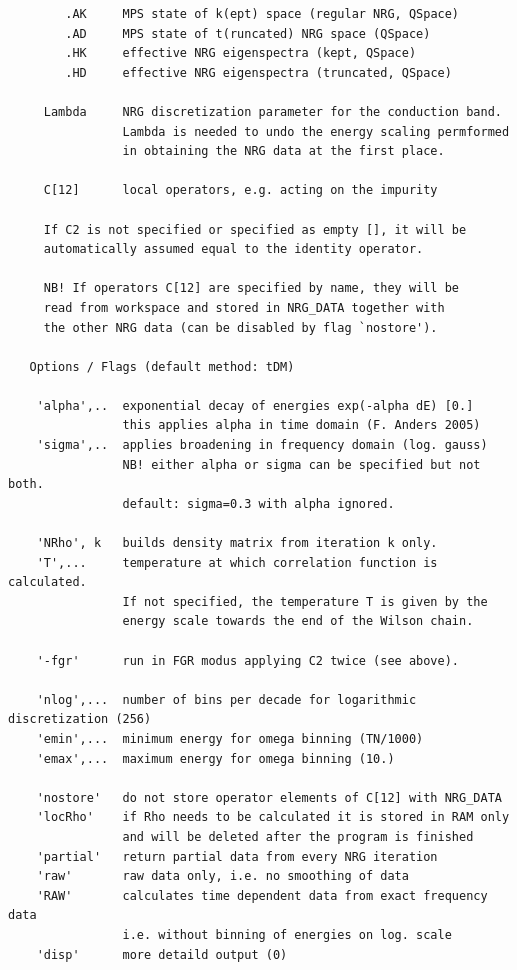 \documentclass[twoside,12pt]{article}
\begin{document}
\begin{verbatim}
        .AK     MPS state of k(ept) space (regular NRG, QSpace)
        .AD     MPS state of t(runcated) NRG space (QSpace)
        .HK     effective NRG eigenspectra (kept, QSpace)
        .HD     effective NRG eigenspectra (truncated, QSpace)
 
     Lambda     NRG discretization parameter for the conduction band.
                Lambda is needed to undo the energy scaling permformed
                in obtaining the NRG data at the first place.
 
     C[12]      local operators, e.g. acting on the impurity
 
     If C2 is not specified or specified as empty [], it will be
     automatically assumed equal to the identity operator.
 
     NB! If operators C[12] are specified by name, they will be
     read from workspace and stored in NRG_DATA together with
     the other NRG data (can be disabled by flag `nostore').
 
   Options / Flags (default method: tDM)
 
    'alpha',..  exponential decay of energies exp(-alpha dE) [0.]
                this applies alpha in time domain (F. Anders 2005)
    'sigma',..  applies broadening in frequency domain (log. gauss)
                NB! either alpha or sigma can be specified but not both.
                default: sigma=0.3 with alpha ignored.
 
    'NRho', k   builds density matrix from iteration k only.
    'T',...     temperature at which correlation function is calculated.
                If not specified, the temperature T is given by the
                energy scale towards the end of the Wilson chain.
 
    '-fgr'      run in FGR modus applying C2 twice (see above).
 
    'nlog',...  number of bins per decade for logarithmic discretization (256)
    'emin',...  minimum energy for omega binning (TN/1000)
    'emax',...  maximum energy for omega binning (10.)
 
    'nostore'   do not store operator elements of C[12] with NRG_DATA
    'locRho'    if Rho needs to be calculated it is stored in RAM only
                and will be deleted after the program is finished
    'partial'   return partial data from every NRG iteration
    'raw'       raw data only, i.e. no smoothing of data
    'RAW'       calculates time dependent data from exact frequency data
                i.e. without binning of energies on log. scale
    'disp'      more detaild output (0)
 

\end{verbatim}
\end{document}
